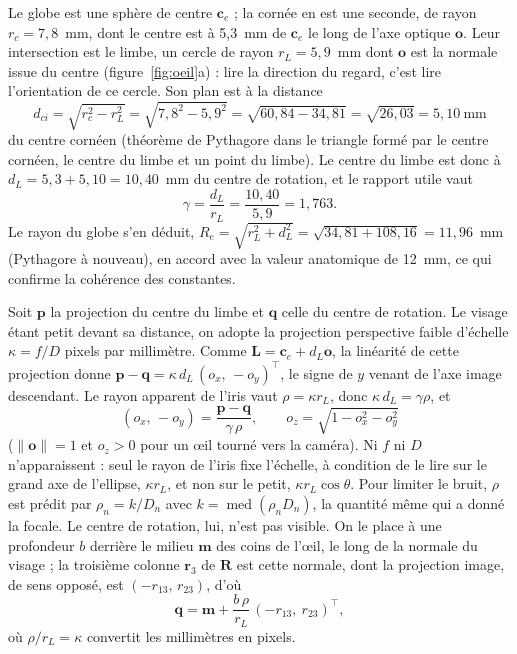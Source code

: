 \documentclass[10pt,a4paper]{article}
\newcommand{\vect}[1]{\symbf{#1}}
\newcommand{\T}{^{\top}}
\DeclareMathOperator{\med}{med}
\begin{document}
Le globe est une sphère de centre $\vect c_e$ ; la cornée en est une seconde, de rayon $r_c=7{,}8$~mm, dont le centre est à 5,3~mm de $\vect c_e$ le long de l'axe optique $\vect o$. Leur intersection est le limbe, un cercle de rayon $r_L=5{,}9$~mm dont $\vect o$ est la normale issue du centre (figure~\ref{fig:oeil}a) : lire la direction du regard, c'est lire l'orientation de ce cercle. Son plan est à la distance
\begin{equation}
d_{ci}=\sqrt{r_c^2-r_L^2}=\sqrt{7{,}8^2-5{,}9^2}=\sqrt{60{,}84-34{,}81}=\sqrt{26{,}03}=5{,}10~\text{mm}
\end{equation}
du centre cornéen (théorème de Pythagore dans le triangle formé par le centre cornéen, le centre du limbe et un point du limbe). Le centre du limbe est donc à $d_L=5{,}3+5{,}10=10{,}40$~mm du centre de rotation, et le rapport utile vaut
\begin{equation}
\gamma=\frac{d_L}{r_L}=\frac{10{,}40}{5{,}9}=1{,}763 .
\end{equation}
Le rayon du globe s'en déduit, $R_e=\sqrt{r_L^2+d_L^2}=\sqrt{34{,}81+108{,}16}=11{,}96$~mm (Pythagore à nouveau), en accord avec la valeur anatomique de 12~mm, ce qui confirme la cohérence des constantes.

Soit $\vect p$ la projection du centre du limbe et $\vect q$ celle du centre de rotation. Le visage étant petit devant sa distance, on adopte la projection perspective faible d'échelle $\kappa=f/D$ pixels par millimètre. Comme $\vect L=\vect c_e+d_L\vect o$, la linéarité de cette projection donne $\vect p-\vect q=\kappa\,d_L\,(o_x,\,-o_y)\T$, le signe de $y$ venant de l'axe image descendant. Le rayon apparent de l'iris vaut $\rho=\kappa r_L$, donc $\kappa\,d_L=\gamma\rho$, et
\begin{equation}\label{eq:observation}
(o_x,\,-o_y)=\frac{\vect p-\vect q}{\gamma\,\rho},\qquad o_z=\sqrt{1-o_x^2-o_y^2}
\end{equation}
($\|\vect o\|=1$ et $o_z>0$ pour un œil tourné vers la caméra). Ni $f$ ni $D$ n'apparaissent : seul le rayon de l'iris fixe l'échelle, à condition de le lire sur le grand axe de l'ellipse, $\kappa r_L$, et non sur le petit, $\kappa r_L\cos\theta$. Pour limiter le bruit, $\rho$ est prédit par $\rho_n=k/D_n$ avec $k=\med(\rho_nD_n)$, la quantité même qui a donné la focale. Le centre de rotation, lui, n'est pas visible. On le place à une profondeur $b$ derrière le milieu $\vect m$ des coins de l'œil, le long de la normale du visage ; la troisième colonne $\vect r_3$ de $\mathbf R$ est cette normale, dont la projection image, de sens opposé, est $(-r_{13},\,r_{23})$, d'où
\begin{equation}
\vect q=\vect m+\frac{b\,\rho}{r_L}\,(-r_{13},\ r_{23})\T,
\end{equation}
où $\rho/r_L=\kappa$ convertit les millimètres en pixels.
\end{document}
